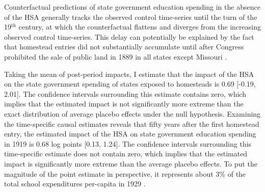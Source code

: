 Counterfactual predictions of state government education spending in the absence of the HSA generally tracks the observed control time-series until the turn of the 19$^\text{th}$ century, at which the counterfactual flattens and diverges from the increasing observed control time-series. This delay can potentially be explained by the fact that homestead entries did not substantially accumulate until after Congress prohibited the sale of public land in 1889 in all states except Missouri \citep{gates1941land,gates1979federal}. 

Taking the mean of post-period impacts, I estimate that the impact of the HSA on the state government spending of states exposed to homesteads is 0.69 [-0.19, 2.01]. The confidence intervals surrounding this estimate contains zero, which implies that the estimated impact is not significantly more extreme than the exact distribution of average placebo effects under the null hypothesis. Examining the time-specific causal estimates reveals that fifty years after the first homestead entry, the estimated impact of the HSA on state government education spending in 1919 is 0.68 log points [0.13, 1.24]. The confidence intervals surrounding this time-specific estimate does not contain zero, which implies that the estimated impact is significantly more extreme than the average placebo effects. To put the magnitude of the point estimate in perspective, it represents about 3\% of the total school expenditures per-capita in 1929 \citep{snyder2010digest}.
 
